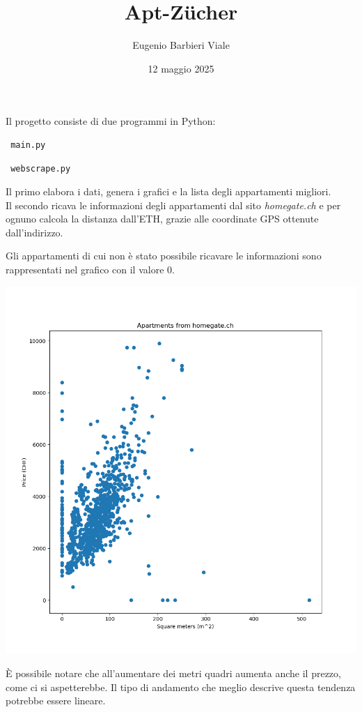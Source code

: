 \documentclass[12pt]{article}
\title{Apt-Zücher}
\author{Eugenio Barbieri Viale}
\date{12 maggio 2025}
\begin{document}
\setlength{\parindent}{0pt}

\maketitle
Il progetto consiste di due programmi in Python:
\begin{verbatim} main.py \end{verbatim} 
\begin{verbatim} webscrape.py \end{verbatim}
Il primo elabora i dati, genera i grafici e la lista degli appartamenti migliori. \\
Il secondo ricava le informazioni degli appartamenti dal sito \textit{homegate.ch} e per ognuno calcola la distanza dall'ETH, grazie alle coordinate GPS ottenute dall'indirizzo.

\newpage
Gli appartamenti di cui non è stato possibile ricavare le informazioni sono rappresentati nel grafico con il valore $0$.

\includegraphics[scale=0.65]{homegate_meters}

È possibile notare che all'aumentare dei metri quadri aumenta anche il prezzo, come ci si aspetterebbe. Il tipo di andamento che meglio descrive questa tendenza potrebbe essere lineare.
\end{document}

